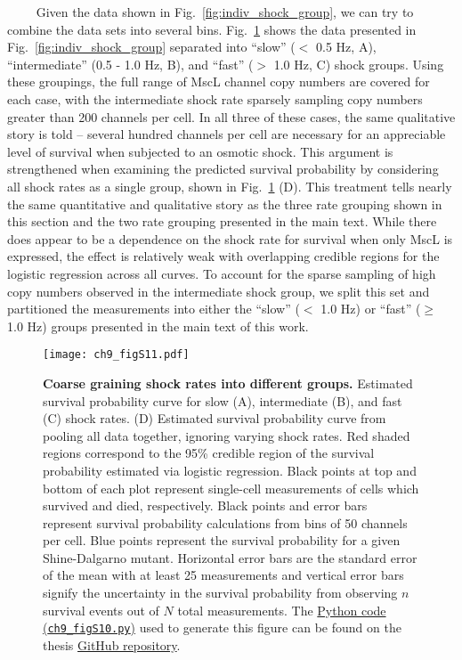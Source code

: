 \documentclass[12pt]{caltech_thesis}
\begin{document}
~~~~ Given the data shown in Fig.~\ref{fig:indiv_shock_group}, we can
try to combine the data sets into several bins.
Fig.~\ref{fig:three_shock_group} shows the data presented in
Fig.~\ref{fig:indiv_shock_group} separated into ``slow'' (\(<\) 0.5 Hz,
A), ``intermediate'' (0.5 - 1.0 Hz, B), and ``fast'' (\(>\) 1.0 Hz, C)
shock groups. Using these groupings, the full range of MscL channel copy
numbers are covered for each case, with the intermediate shock rate
sparsely sampling copy numbers greater than 200 channels per cell. In
all three of these cases, the same qualitative story is told -- several
hundred channels per cell are necessary for an appreciable level of
survival when subjected to an osmotic shock. This argument is
strengthened when examining the predicted survival probability by
considering all shock rates as a single group, shown in
Fig.~\ref{fig:three_shock_group} (D). This treatment tells nearly the
same quantitative and qualitative story as the three rate grouping shown
in this section and the two rate grouping presented in the main text.
While there does appear to be a dependence on the shock rate for
survival when only MscL is expressed, the effect is relatively weak with
overlapping credible regions for the logistic regression across all
curves. To account for the sparse sampling of high copy numbers observed
in the intermediate shock group, we split this set and partitioned the
measurements into either the ``slow'' (\(<\) 1.0 Hz) or ``fast''
(\(\geq\) 1.0 Hz) groups presented in the main text of this work.

\hypertarget{fig:three_shock_group}{%
\begin{figure}
\centering
\texttt{[image: ch9\_figS11.pdf]}
\caption[{Coarse graining shock rates into different
groups.}]{\textbf{Coarse graining shock rates into different groups.}
Estimated survival probability curve for slow (A), intermediate (B), and
fast (C) shock rates. (D) Estimated survival probability curve from
pooling all data together, ignoring varying shock rates. Red shaded
regions correspond to the 95\% credible region of the survival
probability estimated via logistic regression. Black points at top and
bottom of each plot represent single-cell measurements of cells which
survived and died, respectively. Black points and error bars represent
survival probability calculations from bins of 50 channels per cell.
Blue points represent the survival probability for a given
Shine-Dalgarno mutant. Horizontal error bars are the standard error of
the mean with at least 25 measurements and vertical error bars signify
the uncertainty in the survival probability from observing \(n\)
survival events out of \(N\) total measurements. The
\href{https://github.com/gchure/phd/blob/master/src/chapter_09/code/ch9_figS10.py}{Python
code (\texttt{ch9\_figS10.py})} used to generate this figure can be
found on the thesis \href{https://github.com/gchure/phd}{GitHub
repository}.}
\label{fig:three_shock_group}
\end{figure}
}
\end{document}

